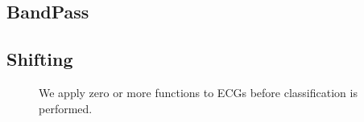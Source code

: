 \documentclass{article}
\begin{document}
\subsection{BandPass}
\subsection{Shifting}

\begin{figure}[htbp]
\centering
  \caption{We apply zero or more functions to ECGs before classification is performed.}\label{fig:approach}
\end{figure}


\end{document}
